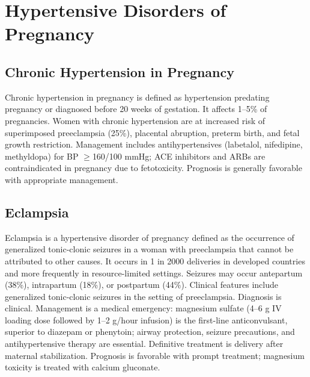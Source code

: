 \section{Hypertensive Disorders of Pregnancy}








\label{sec:Hypertensive Disorders of Pregnancy}

\subsection{Chronic Hypertension in Pregnancy}
\label{sec:Chronic Hypertension in Pregnancy}
Chronic hypertension in pregnancy is defined as hypertension predating pregnancy or diagnosed before 20 weeks of gestation. It affects 1--5\% of pregnancies. Women with chronic hypertension are at increased risk of superimposed preeclampsia (25\%), placental abruption, preterm birth, and fetal growth restriction. Management includes antihypertensives (labetalol, nifedipine, methyldopa) for BP $\ge$160/100 mmHg; ACE inhibitors and ARBs are contraindicated in pregnancy due to fetotoxicity. Prognosis is generally favorable with appropriate management.

\subsection{Eclampsia}
\label{sec:Eclampsia}
Eclampsia is a hypertensive disorder of pregnancy defined as the occurrence of generalized tonic-clonic seizures in a woman with preeclampsia that cannot be attributed to other causes. It occurs in 1 in 2000 deliveries in developed countries and more frequently in resource-limited settings. Seizures may occur antepartum (38\%), intrapartum (18\%), or postpartum (44\%). Clinical features include generalized tonic-clonic seizures in the setting of preeclampsia. Diagnosis is clinical. Management is a medical emergency: magnesium sulfate (4--6 g IV loading dose followed by 1--2 g/hour infusion) is the first-line anticonvulsant, superior to diazepam or phenytoin; airway protection, seizure precautions, and antihypertensive therapy are essential. Definitive treatment is delivery after maternal stabilization. Prognosis is favorable with prompt treatment; magnesium toxicity is treated with calcium gluconate.

